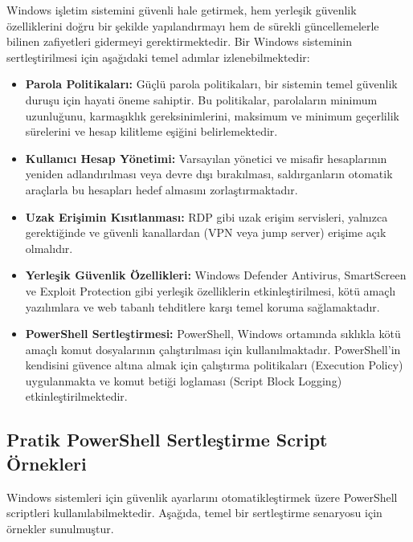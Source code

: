 Windows işletim sistemini güvenli hale getirmek, hem yerleşik güvenlik özelliklerini doğru bir şekilde yapılandırmayı hem de sürekli güncellemelerle bilinen zafiyetleri gidermeyi gerektirmektedir. Bir Windows sisteminin sertleştirilmesi için aşağıdaki temel adımlar izlenebilmektedir:
\begin{itemize}
    \item \textbf{Parola Politikaları:} Güçlü parola politikaları, bir sistemin temel güvenlik duruşu için hayati öneme sahiptir. Bu politikalar, parolaların minimum uzunluğunu, karmaşıklık gereksinimlerini, maksimum ve minimum geçerlilik sürelerini ve hesap kilitleme eşiğini belirlemektedir.
    \item \textbf{Kullanıcı Hesap Yönetimi:} Varsayılan yönetici ve misafir hesaplarının yeniden adlandırılması veya devre dışı bırakılması, saldırganların otomatik araçlarla bu hesapları hedef almasını zorlaştırmaktadır.
    \item \textbf{Uzak Erişimin Kısıtlanması:} RDP gibi uzak erişim servisleri, yalnızca gerektiğinde ve güvenli kanallardan (VPN veya jump server) erişime açık olmalıdır.
    \item \textbf{Yerleşik Güvenlik Özellikleri:} Windows Defender Antivirus, SmartScreen ve Exploit Protection gibi yerleşik özelliklerin etkinleştirilmesi, kötü amaçlı yazılımlara ve web tabanlı tehditlere karşı temel koruma sağlamaktadır.
    \item \textbf{PowerShell Sertleştirmesi:} PowerShell, Windows ortamında sıklıkla kötü amaçlı komut dosyalarının çalıştırılması için kullanılmaktadır. PowerShell'in kendisini güvence altına almak için çalıştırma politikaları (Execution Policy) uygulanmakta ve komut betiği loglaması (Script Block Logging) etkinleştirilmektedir.
\end{itemize}

\subsection{Pratik PowerShell Sertleştirme Script Örnekleri}

Windows sistemleri için güvenlik ayarlarını otomatikleştirmek üzere PowerShell scriptleri kullanılabilmektedir. Aşağıda, temel bir sertleştirme senaryosu için örnekler sunulmuştur.


